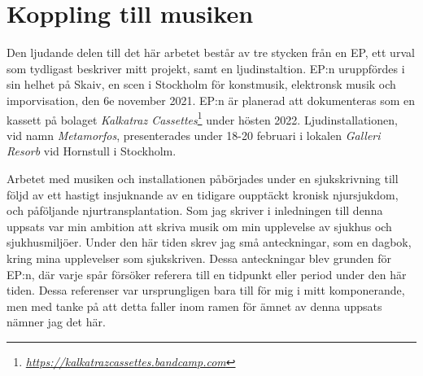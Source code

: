 \documentclass{article}
\begin{document}

\section{Koppling till musiken}
Den ljudande delen till det här arbetet består av tre stycken från en EP, ett urval som tydligast beskriver
mitt projekt, samt en ljudinstaltion. EP:n uruppfördes i sin helhet på Skaiv, en scen i Stockholm för
konstmusik, elektronsk musik och imporvisation, den 6e november 2021. EP:n är planerad att dokumenteras som en
kassett på bolaget \emph{Kalkatraz Cassettes}\footnote{\emph{\url{https://kalkatrazcassettes.bandcamp.com}}} under hösten 2022.
Ljudinstallationen, vid namn \emph{Metamorfos}, presenterades under 18-20 februari i lokalen \emph{Galleri
Resorb} vid Hornstull i Stockholm. 

Arbetet med musiken och installationen påbörjades under en sjukskrivning till följd av ett hastigt
insjuknande av en tidigare oupptäckt kronisk njursjukdom, och påföljande njurtransplantation. Som jag skriver
i inledningen till denna uppsats var min ambition att skriva musik om min upplevelse av sjukhus och
sjukhusmiljöer. Under den här tiden skrev jag små anteckningar, som en dagbok, kring mina upplevelser som
sjukskriven. Dessa anteckningar blev grunden för EP:n, där varje spår försöker referera till en tidpunkt eller
period under den här tiden. Dessa referenser var ursprungligen bara till för mig i mitt komponerande, men med
tanke på att detta faller inom ramen för ämnet av denna uppsats nämner jag det här. 


\end{document}
